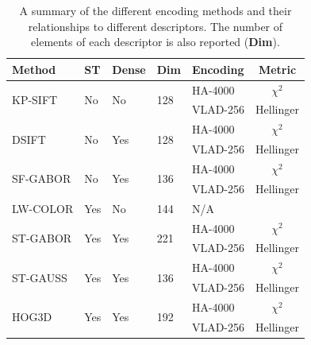 \begin{table}
\caption{A summary of the different encoding methods and their relationships to different descriptors. The number of elements of each descriptor is also reported (\textbf{Dim}).}
\label{tbl:Methods}
\small
\centering
    \begin{tabular}{l p{0.5cm} p{0.9cm} p{0.5cm} p{2.5cm} c }
    \hline
    \textbf{Method}              & \textbf{ST} & \textbf{Dense} & \textbf{Dim}  & \textbf{Encoding}      & \textbf{Metric}    \\ \hline
    \multirow{2}{*}{KP-SIFT} & \multirow{2}{*}{No} & \multirow{2}{*}{No} & \multirow{2}{*}{128}     & HA-4000  &   $\chi^2$    \\ \cline{5-6} 
        ~                   & ~      & ~           & ~      & VLAD-256 & Hellinger \\ \hline
    \multirow{2}{*}{DSIFT} & \multirow{2}{*}{No} & \multirow{2}{*}{Yes} & \multirow{2}{*}{128}     & HA-4000  &   $\chi^2$    \\ \cline{5-6}
    ~                   & ~      & ~           & ~      & VLAD-256 & Hellinger \\ \hline
    \multirow{2}{*}{SF-GABOR} & \multirow{2}{*}{No}               & \multirow{2}{*}{Yes}  & \multirow{2}{*}{136}  & HA-4000  & $\chi^2$      \\  \cline{5-6}
    ~                   & ~      & ~           & ~      & VLAD-256 & Hellinger \\ \hline
    LW-COLOR           & Yes & No & 144           & N/A       \\ \hline
    \multirow{2}{*}{ST-GABOR}          & \multirow{2}{*}{Yes}              & \multirow{2}{*}{Yes}  & \multirow{2}{*}{221}  & HA-4000  & $\chi^2$      \\  \cline{5-6}
    ~                   & ~      & ~           & ~      & VLAD-256 & Hellinger \\ \hline
    \multirow{2}{*}{ST-GAUSS}           & \multirow{2}{*}{Yes}              & \multirow{2}{*}{Yes}  & \multirow{2}{*}{136}  & HA-4000  & $\chi^2$      \\  \cline{5-6}
    ~                   & ~      & ~           & ~      & VLAD-256 & Hellinger \\ \hline
    \multirow{2}{*}{HOG3D}               & \multirow{2}{*}{Yes}              & \multirow{2}{*}{Yes} & \multirow{2}{*}{192}   &  HA-4000  & $\chi^2$      \\  \cline{5-6}
    ~                   & ~       & ~          & ~      & VLAD-256 & Hellinger \\ \hline
    \end{tabular}
    \normalsize
\end{table}


